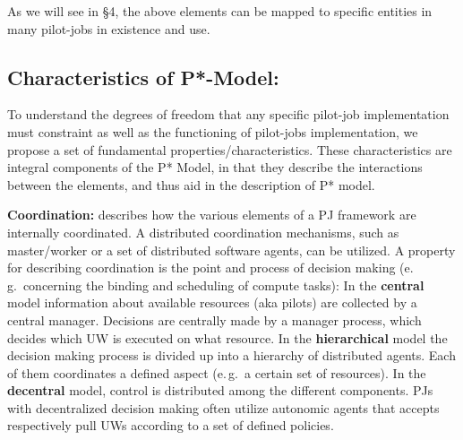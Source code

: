 \documentclass[conference,final]{IEEEtran}
\newcommand{\upp}{\vspace*{-0.5em}}
\begin{document}
As we will see in \S4, the above elements can be mapped to specific
entities in many pilot-jobs in existence and use.

 

% 
% 


\subsection{Characteristics of P*-Model:\upp\upp}
\label{sec:p_star_elements}

To understand the degrees of freedom that any specific pilot-job
implementation must constraint as well as the functioning of
pilot-jobs implementation, we propose a set of fundamental
properties/characteristics. These characteristics are integral
components of the P* Model, in that they describe the interactions
between the elements, and thus aid in the description of P*
model. 


\textbf{Coordination:} describes how the various elements of a PJ framework are
internally coordinated. %
A distributed coordination mechanisms, such as master/worker or a set
of distributed software agents, can be utilized. A property for
describing coordination is the point and process of decision making
(e.\,g.\ concerning the binding and scheduling of compute tasks): In
the \textbf{central} model information about available resources (aka
pilots) are collected by a central manager. Decisions are centrally
made by a manager process, which decides which UW is executed on what
resource. In the \textbf{hierarchical} model the decision making
process is divided up into a hierarchy of distributed agents. Each of
them coordinates a defined aspect (e.\,g.\ a certain set of
resources). In the \textbf{decentral} model, control is distributed
among the different components.  PJs with decentralized decision
making often utilize autonomic agents that accepts respectively pull
UWs according to a set of defined policies.
\end{document}
